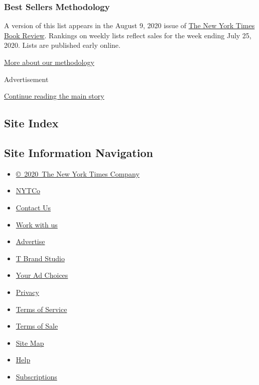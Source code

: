 \hypertarget{best-sellers-methodology-1}{%
\subsubsection{Best Sellers
Methodology}\label{best-sellers-methodology-1}}

A version of this list appears in the August 9, 2020 issue of
\href{http://www.nytimes.com/section/books/review}{The New York Times
Book Review}. Rankings on weekly lists reflect sales for the week ending
July 25, 2020. Lists are published early online.

\href{/books/best-sellers/methodology/}{More about our methodology}

Advertisement

\protect\hyperlink{after-bottom}{Continue reading the main story}

\hypertarget{site-index}{%
\subsection{Site Index}\label{site-index}}

\hypertarget{site-information-navigation}{%
\subsection{Site Information
Navigation}\label{site-information-navigation}}

\begin{itemize}
\tightlist
\item
  \href{https://help.nytimes.com/hc/en-us/articles/115014792127-Copyright-notice}{©~2020~The
  New York Times Company}
\end{itemize}

\begin{itemize}
\tightlist
\item
  \href{https://www.nytco.com/}{NYTCo}
\item
  \href{https://help.nytimes.com/hc/en-us/articles/115015385887-Contact-Us}{Contact
  Us}
\item
  \href{https://www.nytco.com/careers/}{Work with us}
\item
  \href{https://nytmediakit.com/}{Advertise}
\item
  \href{http://www.tbrandstudio.com/}{T Brand Studio}
\item
  \href{https://www.nytimes.com/privacy/cookie-policy\#how-do-i-manage-trackers}{Your
  Ad Choices}
\item
  \href{https://www.nytimes.com/privacy}{Privacy}
\item
  \href{https://help.nytimes.com/hc/en-us/articles/115014893428-Terms-of-service}{Terms
  of Service}
\item
  \href{https://help.nytimes.com/hc/en-us/articles/115014893968-Terms-of-sale}{Terms
  of Sale}
\item
  \href{https://spiderbites.nytimes.com}{Site Map}
\item
  \href{https://help.nytimes.com/hc/en-us}{Help}
\item
  \href{https://www.nytimes.com/subscription?campaignId=37WXW}{Subscriptions}
\end{itemize}
